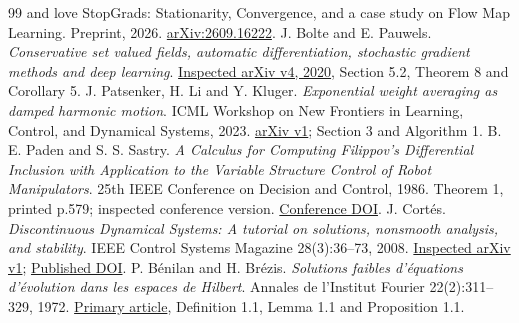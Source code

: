 \documentclass[11pt,a4paper]{article}
\begin{document}
\begin{thebibliography}{99}
{and love StopGrads: Stationarity, Convergence, and a case study on Flow Map
Learning}. Preprint, 2026.
\href{https://arxiv.org/abs/2609.16222}{arXiv:2609.16222}.
 J. Bolte and E. Pauwels.
\emph{Conservative set valued fields, automatic differentiation,
stochastic gradient methods and deep learning}.
\href{https://arxiv.org/abs/1909.10300v4}{Inspected arXiv v4, 2020},
Section 5.2, Theorem 8 and Corollary 5.
 J. Patsenker, H. Li and Y. Kluger.
\emph{Exponential weight averaging as damped harmonic motion}.
ICML Workshop on New Frontiers in Learning, Control, and Dynamical Systems, 2023.
\href{https://arxiv.org/abs/2310.13854v1}{arXiv v1}; Section 3 and Algorithm 1.
 B. E. Paden and S. S. Sastry.
\emph{A Calculus for Computing Filippov's Differential Inclusion with
Application to the Variable Structure Control of Robot Manipulators}.
25th IEEE Conference on Decision and Control, 1986.
Theorem 1, printed p.579; inspected conference version.
\href{https://doi.org/10.1109/CDC.1986.267369}{Conference DOI}.
 J. Cort\'es. \emph{Discontinuous Dynamical Systems:
A tutorial on solutions, nonsmooth analysis, and stability}.
IEEE Control Systems Magazine 28(3):36--73, 2008.
\href{https://arxiv.org/abs/0901.3583v1}{Inspected arXiv v1};
\href{https://doi.org/10.1109/MCS.2008.919306}{Published DOI}.
 P. B\'enilan and H. Br\'ezis.
\emph{Solutions faibles d'\'equations d'\'evolution dans les espaces de Hilbert}.
Annales de l'Institut Fourier 22(2):311--329, 1972.
\href{https://aif.centre-mersenne.org/item/AIF_1972__22_2_311_0/}{Primary article},
Definition 1.1, Lemma 1.1 and Proposition 1.1.
\end{thebibliography}
\end{document}
